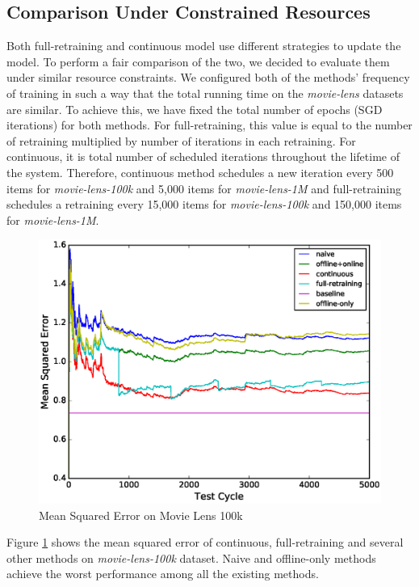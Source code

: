 \documentclass{sig-alternate-05-2015}
\begin{document}
\subsection{Comparison Under Constrained Resources }
Both full-retraining and continuous model use different strategies to update the model.
To perform a fair comparison of the two, we decided to evaluate them under similar resource constraints.
We configured both of the methods' frequency of training in such a way that the total running time on the \textit{movie-lens} datasets are similar.
To achieve this, we have fixed the total number of epochs (SGD iterations) for both methods.
For full-retraining, this value is equal to the number of retraining multiplied by number of iterations in each retraining. 
For continuous, it is total number of scheduled iterations throughout the lifetime of the system.
Therefore, continuous method schedules a new iteration every 500 items for \textit{movie-lens-100k} and 5,000 items for \textit{movie-lens-1M} and full-retraining schedules a retraining every 15,000 items for \textit{movie-lens-100k} and 150,000 items for \textit{movie-lens-1M}.
\begin{figure}[!ht]
\centering
\includegraphics[width=\columnwidth]{../images/experiment-results/movie-lens-100k-quality.eps}
\caption{Mean Squared Error on Movie Lens 100k}
\label{fig:movie-lens-100k-score}
\end{figure}
Figure \ref{fig:movie-lens-100k-score} shows the mean squared error of continuous, full-retraining and several other methods on \textit{movie-lens-100k} dataset.
Naive and offline-only methods achieve the worst performance among all the existing methods.
\end{document}
